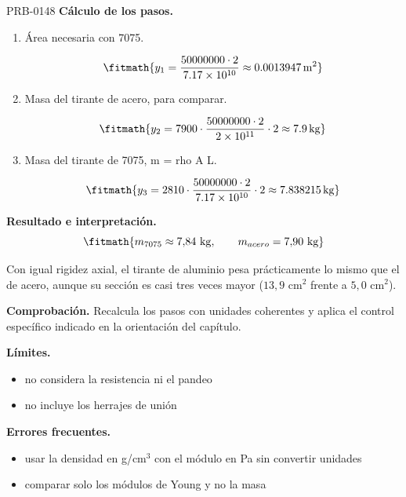 \begin{studiumworked}{PRB-0148}
\textbf{Cálculo de los pasos.}

\begin{enumerate}

\item Área necesaria con 7075.

\[\fitmath{y_{1}=\frac{50000000\cdot 2}{7.17\times10^{10}}\approx 0.0013947\,\mathrm{m^{2}}}\]

\item Masa del tirante de acero, para comparar.

\[\fitmath{y_{2}=7900\cdot \frac{50000000\cdot 2}{2\times10^{11}}\cdot 2\approx 7.9\,\mathrm{kg}}\]

\item Masa del tirante de 7075, m = rho A L.

\[\fitmath{y_{3}=2810\cdot \frac{50000000\cdot 2}{7.17\times10^{10}}\cdot 2\approx 7.838215\,\mathrm{kg}}\]

\end{enumerate}

\textbf{Resultado e interpretación.}\[\fitmath{m_{7075} \approx 7{,}84\ \mathrm{kg},\qquad m_{acero} = 7{,}90\ \mathrm{kg}}\]

Con igual rigidez axial, el tirante de aluminio pesa prácticamente lo mismo que el de acero, aunque su sección es casi tres veces mayor ($13{,}9$ cm$^2$ frente a $5{,}0$ cm$^2$).

\par\textbf{Comprobación.} Recalcula los pasos con unidades coherentes y aplica el control específico indicado en la orientación del capítulo.

\textbf{Límites.}\begin{itemize}\item no considera la resistencia ni el pandeo
\item no incluye los herrajes de unión\end{itemize}

\textbf{Errores frecuentes.}\begin{itemize}\item usar la densidad en g/cm$^3$ con el módulo en Pa sin convertir unidades
\item comparar solo los módulos de Young y no la masa\end{itemize}

\end{studiumworked}

\Needspace{.3\textheight}

